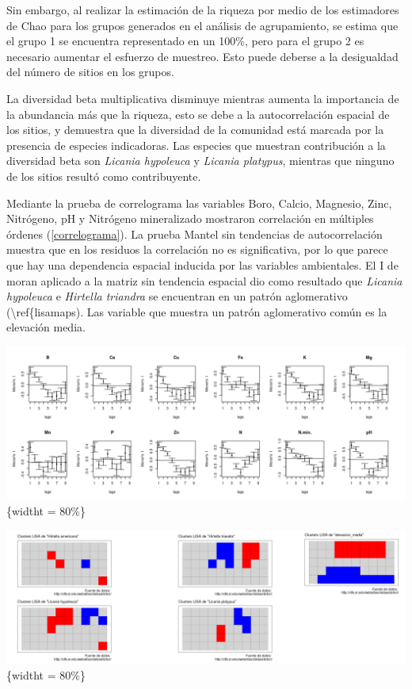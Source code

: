\documentclass[11pt,]{article}
\begin{document}
Sin embargo, al realizar la estimación de la riqueza por medio de los
estimadores de Chao para los grupos generados en el análisis de
agrupamiento, se estima que el grupo 1 se encuentra representado en un
100\%, pero para el grupo 2 es necesario aumentar el esfuerzo de
muestreo. Esto puede deberse a la desigualdad del número de sitios en
los grupos.

La diversidad beta multiplicativa disminuye mientras aumenta la
importancia de la abundancia más que la riqueza, esto se debe a la
autocorrelación espacial de los sitios, y demuestra que la diversidad de
la comunidad está marcada por la presencia de especies indicadoras. Las
especies que muestran contribución a la diversidad beta son
\emph{Licania hypoleuca} y \emph{Licania platypus}, mientras que ninguno
de los sitios resultó como contribuyente.

Mediante la prueba de correlograma las variables Boro, Calcio, Magnesio,
Zinc, Nitrógeno, pH y Nitrógeno mineralizado mostraron correlación en
múltiples órdenes (\ref{correlograma}). La prueba Mantel sin tendencias
de autocorrelación muestra que en los residuos la correlación no es
significativa, por lo que parece que hay una dependencia espacial
inducida por las variables ambientales. El I de moran aplicado a la
matriz sin tendencia espacial dio como resultado que \emph{Licania
hypoleuca} e \emph{Hirtella triandra} se encuentran en un patrón
aglomerativo (\textbackslash{}ref\{lisamaps). Las variable que muestra
un patrón aglomerativo común es la elevación media.

\includegraphics{correlogramavariables.png}\{widtht = 80\%\}

\includegraphics{clusterlisaespecies.png}\{widtht = 80\%\}
\end{document}
